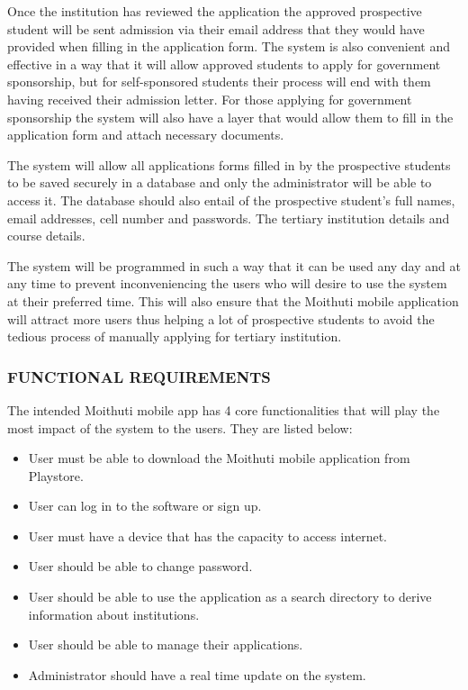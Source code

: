 Once the institution has reviewed the application the approved prospective student will be sent admission via their email address that they would have provided when filling in the application form. The system is also convenient and effective in a way that it will allow approved students to apply for government sponsorship, but for self-sponsored students their process will end with them having received their admission letter. For those applying for government sponsorship the system will also have a layer that would allow them to fill in the application form and attach necessary documents.

The system will allow all applications forms filled in by the prospective students to be saved securely in a database and only the administrator will be able to access it. The database should also entail of the prospective student’s full names, email addresses, cell number and passwords. The tertiary institution details and course details.  

The system will be programmed in such a way that it can be used any day and at any time to prevent inconveniencing the users who will desire to use the system at their preferred time. This will also ensure that the Moithuti mobile application will attract more users thus helping a lot of prospective students to avoid the tedious process of manually applying for tertiary institution.

\subsubsection{FUNCTIONAL REQUIREMENTS}
The intended Moithuti mobile app has 4 core functionalities that will play the most impact of the system to the users. They are listed below:
\begin{itemize}
	\item User must be able to download the Moithuti mobile application from Playstore.
	\item User can log in to the software or sign up.
	\item User must have a device that has the capacity to access internet.
	\item User should be able to change password.
	\item User should be able to use the application as a search directory to derive information about institutions.
	\item User should be able to manage their applications.
	\item Administrator should have a real time update on the system.
	
\end{itemize}


